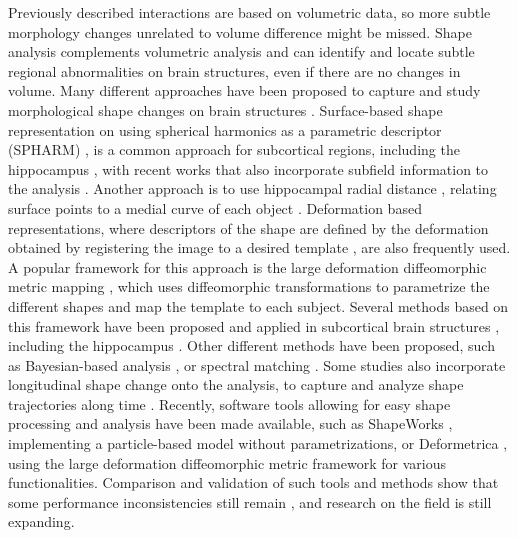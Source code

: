 Previously described interactions are based on volumetric data, so more subtle morphology changes unrelated to volume difference might be missed. Shape analysis complements volumetric analysis and can identify and locate subtle regional abnormalities on brain structures, even if there are no changes in volume. Many different approaches have been proposed to capture and study morphological shape changes on brain structures \cite{Nitzken2014,Zhang2016,Shen2017a}. Surface-based shape representation on using spherical harmonics as a parametric descriptor (SPHARM) \cite{Styner2006}, is a common approach for subcortical regions, including the hippocampus \cite{Shen2003,Styner2004,Shi2007,Zhao2008}, with recent works that also incorporate subfield information to the analysis \cite{Cong2015,Inlow2016}. Another approach is to use hippocampal radial distance \cite{Thompson2004}, relating surface points to a medial curve of each object \cite{Bouix2005,Morra2009,Apostolova2010,Costafreda2011,Chung2010}. Deformation based representations, where descriptors of the shape are defined by the deformation obtained by registering the image to a desired template \cite{Kim2015a,Joshi2016}, are also frequently used. A popular framework for this approach is the large deformation diffeomorphic metric mapping \cite{Beg2005,Miller2006}, which uses diffeomorphic transformations to parametrize the different shapes and map the template to each subject. Several methods based on this framework have been proposed and applied in subcortical brain structures \cite{Vaillant2007,Durrleman2014,Singh2014,Younes2014,Miller2015,Li2017f}, including the hippocampus \cite{Qiu2009,Tang2016,Cury2018}. Other different methods have been proposed, such as Bayesian-based analysis \cite{Gori2017,Gutierrez2019}, or spectral matching \cite{Shakeri2016a}. Some studies also incorporate longitudinal shape change onto the analysis, to capture and analyze shape trajectories along time \cite{Miller2015,Bone2018,Cury2019a}. Recently, software tools allowing for easy shape processing and analysis have been made available, such as ShapeWorks \cite{Cates2017}, implementing a particle-based model without parametrizations, or Deformetrica \cite{Bone2018a}, using the large deformation diffeomorphic metric framework for various functionalities. Comparison and validation of such tools and methods show that some performance inconsistencies still remain \cite{Madan2017,Gao2014,Goparaju2018}, and research on the field is still expanding. \\ 

